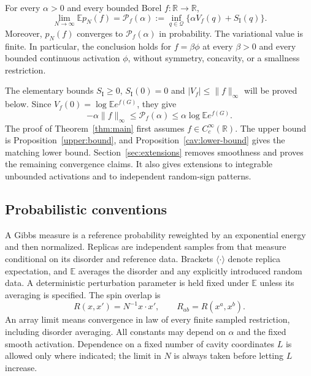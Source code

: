 \begin{theorem}\label{thm:main}
For every $\alpha>0$ and every bounded Borel $f:\mathbb R\to\mathbb R$,
\begin{equation}\label{thm:formula}
 \lim_{N\to\infty}\mathbb E p_N(f)
 =\mathcal P_f(\alpha)
 :=\inf_{q\in\mathcal Q}\{\alpha V_f(q)+S_{\mathrm I}(q)\}.
\end{equation}
Moreover, $p_N(f)$ converges to $\mathcal P_f(\alpha)$ in probability.
The variational value is finite. In particular, the conclusion holds for
$f=\beta\phi$ at every $\beta>0$ and every bounded continuous activation
$\phi$, without symmetry, concavity, or a smallness restriction.
\end{theorem}

The elementary bounds $S_{\mathrm I}\ge0$, $S_{\mathrm I}(0)=0$ and
$|V_f|\le\|f\|_\infty$ will be proved below. Since
$V_f(0)=\log\mathbb E e^{f(G)}$, they give
\begin{equation}\label{def:finite-value}
 -\alpha\|f\|_\infty\le\mathcal P_f(\alpha)
 \le\alpha\log\mathbb E e^{f(G)}.
\end{equation}
The proof of Theorem~\ref{thm:main} first assumes $f\in C_c^\infty(\mathbb R)$.
The upper bound is Proposition~\ref{upper:bound}, and
Proposition~\ref{cav:lower-bound} gives the matching lower bound.
Section~\ref{sec:extensions} removes smoothness
and proves the remaining convergence claims. It also gives extensions to
integrable unbounded activations and to independent random-sign patterns.

\subsection{Probabilistic conventions}

A Gibbs measure is a reference probability reweighted by an exponential
energy and then normalized. Replicas are independent samples from that
measure conditional on its disorder and reference data. Brackets
$\langle\cdot\rangle$ denote replica expectation, and $\mathbb E$ averages
the disorder and any explicitly introduced random data. A deterministic
perturbation parameter is held fixed under $\mathbb E$ unless its averaging
is specified. The spin overlap is
\[
 R(x,x')=N^{-1}x\cdot x',\qquad R_{ab}=R(x^a,x^b).
\]
An array limit means convergence in law of every finite sampled restriction,
including disorder averaging. All constants may depend on $\alpha$ and the
fixed smooth activation. Dependence on a fixed number of cavity coordinates
$L$ is allowed only where indicated; the limit in $N$ is always taken before
letting $L$ increase.
